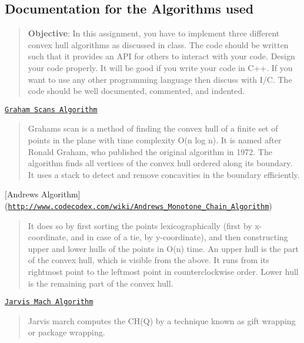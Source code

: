 \subsection*{Documentation for the Algorithms used }

\begin{quote}
{\bfseries Objective}\+: In this assignment, you have to implement three different convex hull algorithms as discussed in class. The code should be written such that it provides an A\+PI for others to interact with your code. Design your code properly. It will be good if you write your code in C++. If you want to use any other programming language then discuss with I/C. The code should be well documented, commented, and indented. \end{quote}



\begin{DoxyEnumerate}
\item \href{https://en.wikipedia.org/wiki/Graham_scan}{\tt Graham Scans Algorithm} \begin{quote}
Graham\textquotesingle{}s scan is a method of finding the convex hull of a finite set of points in the plane with time complexity O(n log n). It is named after Ronald Graham, who published the original algorithm in 1972. The algorithm finds all vertices of the convex hull ordered along its boundary. It uses a stack to detect and remove concavities in the boundary efficiently. \end{quote}

\item \mbox{[}Andrews Algorithm\mbox{]}(\href{http://www.codecodex.com/wiki/Andrew's_Monotone_Chain_Algorithm}{\tt http\+://www.\+codecodex.\+com/wiki/\+Andrew\textquotesingle{}s\+\_\+\+Monotone\+\_\+\+Chain\+\_\+\+Algorithm}) \begin{quote}
It does so by first sorting the points lexicographically (first by x-\/coordinate, and in case of a tie, by y-\/coordinate), and then constructing upper and lower hulls of the points in O(n) time. An upper hull is the part of the convex hull, which is visible from the above. It runs from its rightmost point to the leftmost point in counterclockwise order. Lower hull is the remaining part of the convex hull. \end{quote}

\item \href{http://www.personal.kent.edu/~rmuhamma/Compgeometry/MyCG/ConvexHull/jarvisMarch.htm}{\tt Jarvis Mach Algorithm} \begin{quote}
Jarvis march computes the C\+H(\+Q) by a technique known as gift wrapping or package wrapping.\end{quote}

\end{DoxyEnumerate}